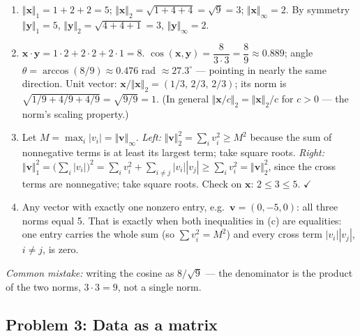\documentclass[
  11pt,
]{article}
\newcommand{\answerpage}{\clearpage}
\begin{document}
\begin{solutionbox}

\begin{enumerate}
\def\labelenumi{(\alph{enumi})}
\item
  \(\Vert\mathbf{x}\Vert_1 = 1+2+2 = 5\);
  \(\Vert\mathbf{x}\Vert_2 = \sqrt{1+4+4} = \sqrt 9 = 3\);
  \(\Vert\mathbf{x}\Vert_\infty = 2\). By symmetry
  \(\Vert\mathbf{y}\Vert_1 = 5\),
  \(\Vert\mathbf{y}\Vert_2 = \sqrt{4+4+1} = 3\),
  \(\Vert\mathbf{y}\Vert_\infty = 2\).
\item
  \(\mathbf{x}\cdot\mathbf{y} = 1\cdot2 + 2\cdot2 + 2\cdot1 = 8\).
  \(\cos(\mathbf{x},\mathbf{y}) = \dfrac{8}{3\cdot 3} = \dfrac{8}{9} \approx 0.889\);
  angle \(\theta = \arccos(8/9) \approx 0.476\) rad
  \(\approx 27.3^\circ\) --- pointing in nearly the same direction. Unit
  vector: \(\mathbf{x}/\Vert\mathbf{x}\Vert_2 = (1/3,\,2/3,\,2/3)\); its
  norm is \(\sqrt{1/9 + 4/9 + 4/9} = \sqrt{9/9} = 1\). (In general
  \(\Vert\mathbf{x}/c\Vert_2 = \Vert\mathbf{x}\Vert_2/c\) for \(c>0\)
  --- the norm's scaling property.)
\item
  Let \(M = \max_i |v_i| = \Vert\mathbf{v}\Vert_\infty\). \emph{Left:}
  \(\Vert\mathbf{v}\Vert_2^2 = \sum_i v_i^2 \ge M^2\) because the sum of
  nonnegative terms is at least its largest term; take square roots.
  \emph{Right:}
  \(\Vert\mathbf{v}\Vert_1^2 = \big(\sum_i |v_i|\big)^2 = \sum_i v_i^2 + \sum_{i\ne j}|v_i||v_j| \ge \sum_i v_i^2 = \Vert\mathbf{v}\Vert_2^2\),
  since the cross terms are nonnegative; take square roots. Check on
  \(\mathbf{x}\): \(2 \le 3 \le 5\). \(\checkmark\)
\item
  Any vector with exactly one nonzero entry,
  e.g.~\(\mathbf{v} = (0,-5,0)\): all three norms equal 5. That is
  exactly when both inequalities in (c) are equalities: one entry
  carries the whole sum (so \(\sum v_i^2 = M^2\)) and every cross term
  \(|v_i||v_j|\), \(i\ne j\), is zero.
\end{enumerate}

\emph{Common mistake:} writing the cosine as \(8/\sqrt{9}\) --- the
denominator is the product of the two norms, \(3\cdot3=9\), not a single
norm.

\end{solutionbox}

\answerpage

\subsection{Problem 3: Data as a
matrix}\label{problem-3-data-as-a-matrix}
\end{document}
